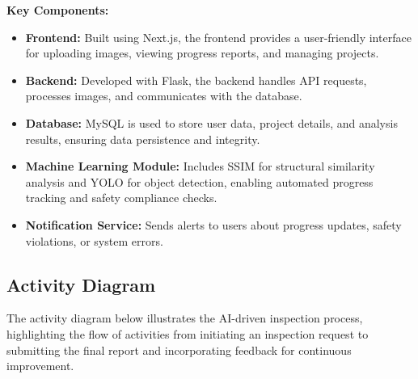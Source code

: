 \documentclass[12pt,a4paper]{report}
\begin{document}
\textbf{Key Components:}
\begin{itemize}
    \item \textbf{Frontend:} Built using Next.js, the frontend provides a user-friendly interface for uploading images, viewing progress reports, and managing projects.
    \item \textbf{Backend:} Developed with Flask, the backend handles API requests, processes images, and communicates with the database.
    \item \textbf{Database:} MySQL is used to store user data, project details, and analysis results, ensuring data persistence and integrity.
    \item \textbf{Machine Learning Module:} Includes SSIM for structural similarity analysis and YOLO for object detection, enabling automated progress tracking and safety compliance checks.
    \item \textbf{Notification Service:} Sends alerts to users about progress updates, safety violations, or system errors.
\end{itemize}

\subsection{Activity Diagram}
The activity diagram below illustrates the AI-driven inspection process, highlighting the flow of activities from initiating an inspection request to submitting the final report and incorporating feedback for continuous improvement.
\end{document}
